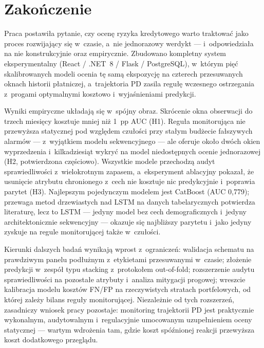 
\section*{Zakończenie}

Praca postawiła pytanie, czy ocenę ryzyka kredytowego warto traktować jako
proces rozwijający się w~czasie, a~nie jednorazowy werdykt --- i~odpowiedziała
na nie konstrukcyjnie oraz empirycznie. Zbudowano kompletny system
eksperymentalny (React / .NET~8 / Flask / PostgreSQL), w~którym pięć
skalibrowanych modeli ocenia tę samą ekspozycję na czterech przesuwanych oknach
historii płatniczej, a~trajektoria PD zasila regułę wczesnego ostrzegania
z~progami optymalnymi kosztowo i~wyjaśnieniami predykcji.

Wyniki empiryczne układają się w~spójny obraz. Skrócenie okna obserwacji do
trzech miesięcy kosztuje mniej niż 1~pp AUC (H1). Reguła monitorująca nie
przewyższa statycznej pod względem czułości przy stałym budżecie fałszywych
alarmów --- z~wyjątkiem modelu sekwencyjnego --- ale oferuje około dwóch okien
wyprzedzenia i~kilkadziesiąt wykryć na model niedostępnych ocenie jednorazowej
(H2, potwierdzona częściowo). Wszystkie modele przechodzą audyt sprawiedliwości
z~wielokrotnym zapasem, a~eksperyment ablacyjny pokazał, że usunięcie atrybutu
chronionego z~cech nie kosztuje nic predykcyjnie i~poprawia parytet (H3).
Najlepszym pojedynczym modelem jest CatBoost (AUC 0,779); przewaga metod
drzewiastych nad LSTM na danych tabelarycznych potwierdza literaturę, lecz to
LSTM --- jedyny model bez cech demograficznych i~jedyny architektonicznie
sekwencyjny --- okazuje się najbliższy parytetu i~jako jedyny zyskuje na regule
monitorującej także w~czułości.

Kierunki dalszych badań wynikają wprost z~ograniczeń: walidacja schematu na
prawdziwym panelu podłużnym z~etykietami przesuwanymi w~czasie; złożenie
predykcji w~zespół typu stacking z~protokołem out-of-fold; rozszerzenie audytu
sprawiedliwości na pozostałe atrybuty i~analiza mitygacji progowej; wreszcie
kalibracja modelu kosztów FN/FP na rzeczywistych stratach portfelowych, od
której zależy bilans reguły monitorującej. Niezależnie od tych rozszerzeń,
zasadniczy wniosek pracy pozostaje: monitoring trajektorii PD jest praktycznie
wykonalnym, audytowalnym i~regulacyjnie umocowanym uzupełnieniem oceny
statycznej --- wartym wdrożenia tam, gdzie koszt spóźnionej reakcji przewyższa
koszt dodatkowego przeglądu.
